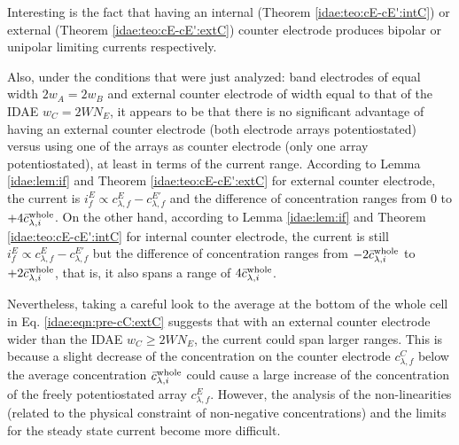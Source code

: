 Interesting is the fact that having an internal (Theorem \ref{idae:teo:cE-cE':intC})
or external (Theorem \ref{idae:teo:cE-cE':extC}) counter electrode
produces bipolar or unipolar limiting currents respectively.

Also, under the conditions that were just analyzed: 
band electrodes of equal width $2w_{A} = 2w_{B}$ 
and external counter electrode of width equal to that of the IDAE $w_{C} = 2W N_{E}$,
it appears to be that there is no significant advantage
of having an external counter electrode (both electrode arrays potentiostated)
versus using one of the arrays as counter electrode (only one array potentiostated),
at least in terms of the current range.
According to Lemma \ref{idae:lem:if} and Theorem \ref{idae:teo:cE-cE':extC} for external counter electrode,
the current is $i_{f}^{E} \propto c_{\lambda,f}^{E} - c_{\lambda,f}^{E'}$
and the difference of concentration ranges from $0$ to $+4\bar{c}_{\lambda,i}^{\text{whole}}$.
On the other hand, according to Lemma \ref{idae:lem:if} and Theorem \ref{idae:teo:cE-cE':intC} for internal counter electrode,
the current is still $i_{f}^{E} \propto c_{\lambda,f}^{E} - c_{\lambda,f}^{E'}$
but the difference of concentration ranges from $-2\bar{c}_{\lambda,i}^{\text{whole}}$ to $+2\bar{c}_{\lambda,i}^{\text{whole}}$, that is, it also spans a range of $4\bar{c}_{\lambda,i}^{\text{whole}}$.

Nevertheless, taking a careful look to the average at the bottom of the whole cell in Eq. \eqref{idae:eqn:pre-cC:extC} %
suggests that with an external counter electrode wider than the IDAE $w_{C} \geq 2W N_{E}$,
the current could span larger ranges.
This is because a slight decrease of the concentration on the counter electrode $c_{\lambda,f}^{C}$
below the average concentration $\bar{c}_{\lambda,i}^{\text{whole}}$
could cause a large increase of the concentration of the freely potentiostated array $c_{\lambda,f}^{E}$.
However, the analysis of the non-linearities
(related to the physical constraint of non-negative concentrations)
and the limits for the steady state current become more difficult.
